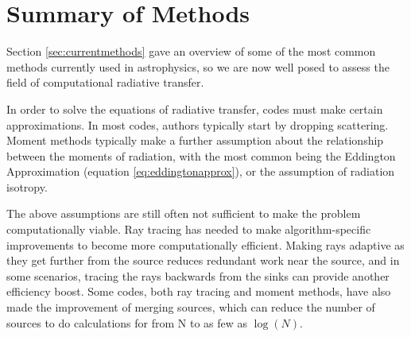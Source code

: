 
%
%

\section{Summary of Methods}
\label{sec:summaryofmethods}

Section \ref{sec:currentmethods} gave an overview of some of the most common methods currently used in astrophysics, so we are now well posed to assess the field of computational radiative transfer.

In order to solve the equations of radiative transfer, codes must make certain approximations. In most codes, authors typically start by dropping scattering. Moment methods typically make a further assumption about the relationship between the moments of radiation, with the most common being the Eddington Approximation (equation \ref{eq:eddingtonapprox}), or the assumption of radiation isotropy.

The above assumptions are still often not sufficient to make the problem computationally viable. Ray tracing has needed to make algorithm-specific improvements to become more computationally efficient. Making rays adaptive as they get further from the source reduces redundant work near the source, and in some scenarios, tracing the rays backwards from the sinks can provide another efficiency boost. Some codes, both ray tracing and moment methods, have also made the improvement of merging sources, which can reduce the number of sources to do calculations for from N to as few as $\log(N)$.

